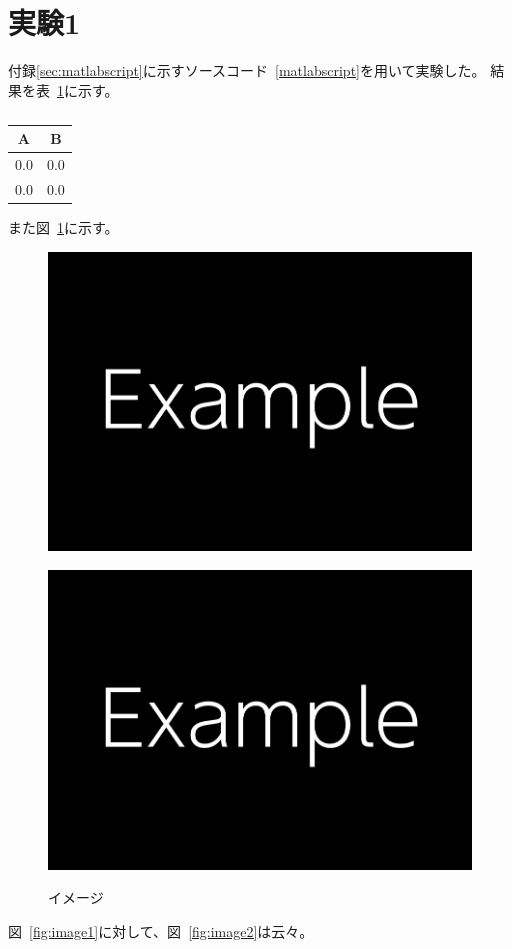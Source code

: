 \documentclass[a4paper, book, twoside, openany, fontsize = 11pt, gutter = 3cm]{jlreq}
\newcommand{\tbref}{表~\ref}
\newcommand{\figref}{図~\ref}
\newcommand{\lisref}{ソースコード~\ref}
\begin{document}
			\section{実験1}
				付録\ref{sec:matlabscript}に示す\lisref{matlabscript}を用いて実験した。
				結果を\tbref{tb:kekka}に示す。
				\begin{table}[H]
					\centering
					\caption{}
					\label{tb:kekka}
					\begin{tabular}{c|c}
						\hline
						A & B \\
						\hline
						$0.0$ & $0.0$ \\
						$0.0$ & $0.0$ \\
						\hline
					\end{tabular}
				\end{table}
				また\figref{fig:images}に示す。
				\begin{figure}[H]
					\centering
					\begin{minipage}[b]{0.45\columnwidth}
						\centering
						\includegraphics[width=0.96\columnwidth]{image.png}
						\label{fig:image1}
					\end{minipage}
					\begin{minipage}[b]{0.45\columnwidth}
						\centering
						\includegraphics[width=0.96\columnwidth]{image.png}
						\label{fig:image2}
					\end{minipage}
					\caption{イメージ}
					\label{fig:images}
				\end{figure}
				\figref{fig:image1}に対して、\figref{fig:image2}は云々。
\end{document}
